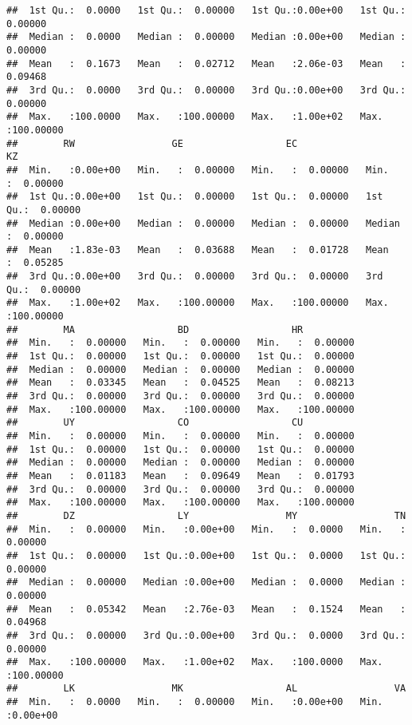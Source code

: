 \documentclass[
]{article}
\begin{document}
\begin{verbatim}
##  1st Qu.:  0.0000   1st Qu.:  0.00000   1st Qu.:0.00e+00   1st Qu.:  0.00000  
##  Median :  0.0000   Median :  0.00000   Median :0.00e+00   Median :  0.00000  
##  Mean   :  0.1673   Mean   :  0.02712   Mean   :2.06e-03   Mean   :  0.09468  
##  3rd Qu.:  0.0000   3rd Qu.:  0.00000   3rd Qu.:0.00e+00   3rd Qu.:  0.00000  
##  Max.   :100.0000   Max.   :100.00000   Max.   :1.00e+02   Max.   :100.00000  
##        RW                 GE                  EC                  KZ           
##  Min.   :0.00e+00   Min.   :  0.00000   Min.   :  0.00000   Min.   :  0.00000  
##  1st Qu.:0.00e+00   1st Qu.:  0.00000   1st Qu.:  0.00000   1st Qu.:  0.00000  
##  Median :0.00e+00   Median :  0.00000   Median :  0.00000   Median :  0.00000  
##  Mean   :1.83e-03   Mean   :  0.03688   Mean   :  0.01728   Mean   :  0.05285  
##  3rd Qu.:0.00e+00   3rd Qu.:  0.00000   3rd Qu.:  0.00000   3rd Qu.:  0.00000  
##  Max.   :1.00e+02   Max.   :100.00000   Max.   :100.00000   Max.   :100.00000  
##        MA                  BD                  HR           
##  Min.   :  0.00000   Min.   :  0.00000   Min.   :  0.00000  
##  1st Qu.:  0.00000   1st Qu.:  0.00000   1st Qu.:  0.00000  
##  Median :  0.00000   Median :  0.00000   Median :  0.00000  
##  Mean   :  0.03345   Mean   :  0.04525   Mean   :  0.08213  
##  3rd Qu.:  0.00000   3rd Qu.:  0.00000   3rd Qu.:  0.00000  
##  Max.   :100.00000   Max.   :100.00000   Max.   :100.00000  
##        UY                  CO                  CU           
##  Min.   :  0.00000   Min.   :  0.00000   Min.   :  0.00000  
##  1st Qu.:  0.00000   1st Qu.:  0.00000   1st Qu.:  0.00000  
##  Median :  0.00000   Median :  0.00000   Median :  0.00000  
##  Mean   :  0.01183   Mean   :  0.09649   Mean   :  0.01793  
##  3rd Qu.:  0.00000   3rd Qu.:  0.00000   3rd Qu.:  0.00000  
##  Max.   :100.00000   Max.   :100.00000   Max.   :100.00000  
##        DZ                  LY                 MY                 TN           
##  Min.   :  0.00000   Min.   :0.00e+00   Min.   :  0.0000   Min.   :  0.00000  
##  1st Qu.:  0.00000   1st Qu.:0.00e+00   1st Qu.:  0.0000   1st Qu.:  0.00000  
##  Median :  0.00000   Median :0.00e+00   Median :  0.0000   Median :  0.00000  
##  Mean   :  0.05342   Mean   :2.76e-03   Mean   :  0.1524   Mean   :  0.04968  
##  3rd Qu.:  0.00000   3rd Qu.:0.00e+00   3rd Qu.:  0.0000   3rd Qu.:  0.00000  
##  Max.   :100.00000   Max.   :1.00e+02   Max.   :100.0000   Max.   :100.00000  
##        LK                 MK                  AL                 VA          
##  Min.   :  0.0000   Min.   :  0.00000   Min.   :0.00e+00   Min.   :0.00e+00  

\end{verbatim}
\end{document}
